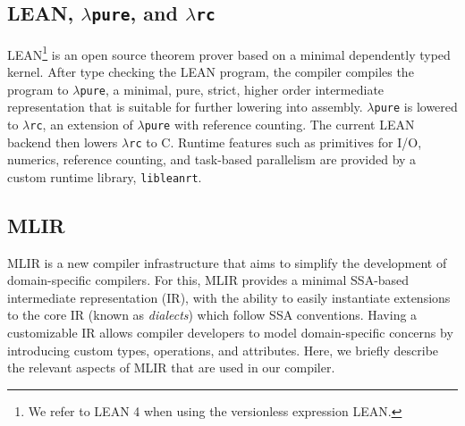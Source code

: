 \documentclass[conference]{IEEEtran}
\newcommand{\lambdapure}{\ensuremath{\lambda}\texttt{pure}}
\newcommand{\lambdarc}{\ensuremath{\lambda}\texttt{rc}}
\begin{document}
\subsection{LEAN, \lambdapure{}, and \lambdarc{}}

LEAN\footnote{We refer to LEAN 4 when using the versionless expression LEAN.} \cite{de2015lean} is an open source theorem prover based
on a minimal dependently typed \cite{pierce2005advanced} kernel. After type checking
the LEAN program, the compiler compiles the program to \lambdapure{}, a
minimal, pure, strict, higher order intermediate representation that is suitable
for further lowering into assembly. \lambdapure{} is lowered to \lambdarc{}, an extension
of \lambdapure{} with reference counting. The current LEAN backend then lowers
\lambdarc{} to C.  Runtime features such as primitives for I/O, numerics,
reference counting, and task-based parallelism are provided by a custom runtime library,
\texttt{libleanrt}.





\subsection{MLIR}

MLIR \cite{lattner2020mlir} is a new compiler infrastructure that
aims to simplify the development of domain-specific compilers. For this, MLIR
provides a minimal SSA-based intermediate representation (IR), with the
ability to easily instantiate extensions to the core IR  (known as \emph{dialects})
which follow  SSA conventions. Having a customizable IR allows compiler
developers to model domain-specific concerns by introducing custom types,
operations, and attributes. Here, we briefly describe the relevant aspects of
MLIR that are used in our compiler.
\end{document}
